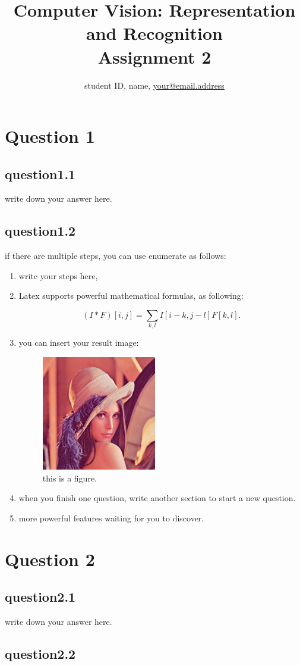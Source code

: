 \documentclass[a4paper,UTF8]{article}
\numberwithin{equation}{section}
\begin{document}
\title{Computer Vision: Representation and Recognition\\
Assignment 2}
\author{student ID, name, \href{mailto:your@email.address}{your@email.address}}
\maketitle

\section{Question 1}

\subsection{question1.1}
write down your answer here.

\subsection{question1.2}
if there are multiple steps, you can use enumerate as follows:

\begin{enumerate}[(\romannumeral1)]
	\item write your steps here,
	\item Latex supports powerful mathematical formulas, as following:

	\begin{equation}
		(I*F)[i,j]=\sum_{k,l}I[i-k,j-l]F[k,l].
	\end{equation}
	
	\item you can insert your result image:
	
	\begin{figure}[h]
		\centering  %
		\includegraphics[width=5cm,height=5cm]{lenna.png}  %
		\caption{this is a figure.}  %
		\label{fig:mcmthesis-logo}   %
	\end{figure}
	\item when you finish one question, write another section to start a new question.
	\item more powerful features waiting for you to discover.
	
\end{enumerate} 

\section{Question 2}

\subsection{question2.1}
write down your answer here.

\subsection{question2.2}



\end{document}
